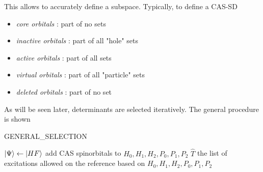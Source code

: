 \documentclass[./thesis.tex]{subfiles}
\begin{document}
This allows to accurately define a subspace. Typically, to define a CAS-SD

\begin{itemize}
\item
\emph{core orbitals} : part of no sets
\item
\emph{inactive orbitals} : part of all "hole" sets
\item
\emph{active orbitals} : part of all sets
\item
\emph{virtual orbitals} : part of all "particle" sets
\item
\emph{deleted orbitals} : part of no set
\end{itemize}


 As will be seen later, determinants are selected iteratively. The general procedure is shown 



\begin{algorithm}
	\caption{GENERAL\_SELECTION}	
	\label{alg:GENERAL_SELECTION}	
	$\ket {\Psi} \gets \ket {HF}$\;
	add CAS spinorbitals to $H_0, H_1, H_2, P_0, P_1, P_2$ \;
	$\hat T$ the list of excitations allowed on the reference based on $H_0, H_1, H_2, P_0, P_1, P_2$ \;
	
\end{algorithm}
\end{document}
